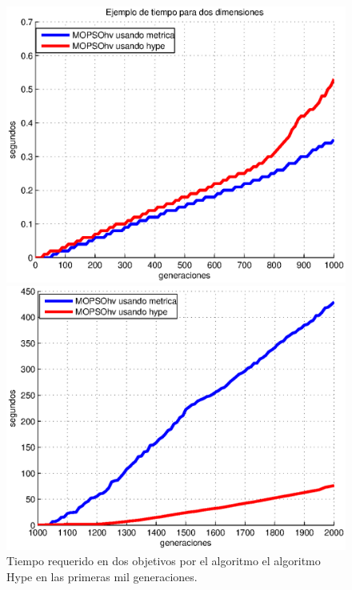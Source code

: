 \begin{enumerate}
\begin{itemize}
      \DIFdelend 

      
      \begin{figure}
\centering
  \begin{minipage}{0.45\textwidth}
    \centering
    \includegraphics[scale=0.5]{Cap3/time1.eps}
    \caption[Tiempo entre MOPSOhv en dos dimensiones (a)]{Tiempo requerido en dos objetivos por el algoritmo \DIFdelbeginFL {}\DIFdelendFL \DIFaddbeginFL {}\DIFaddendFL el \DIFdelbeginFL {}\DIFdelendFL algoritmo Hype en las primeras mil generaciones.}
    \label{fig:time1}
  \end{minipage}%
  \hspace{5mm}
  \begin{minipage}{0.4\textwidth}
    \centering
    \DIFdelbeginFL %
\DIFdelendFL \DIFaddbeginFL \includegraphics[scale=0.5]{Cap3/time2.eps}

\end{minipage}
\end{figure}
\end{itemize}
\end{enumerate}
